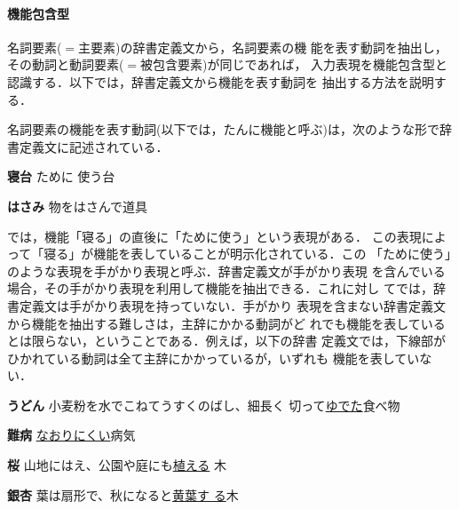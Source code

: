 \documentclass{nlp}
\begin{document}
\paragraph{機能包含型}名詞要素($=$主要素)の辞書定義文から，名詞要素の機
能を表す動詞を抽出し，その動詞と動詞要素($=$被包含要素)が同じであれば，
入力表現を機能包含型と認識する．以下では，辞書定義文から機能を表す動詞を
抽出する方法を説明する．

名詞要素の機能を表す動詞(以下では，たんに機能と呼ぶ)は，次のような形で辞
書定義文に記述されている．
\begin{example}
 \item {\bf 寝台} \hspace{10pt}ために
 使う台 
 
 \item {\bf はさみ} \hspace{10pt}物をはさんで道具 
\end{example}
では，機能「寝る」の直後に「ために使う」という表現がある．
この表現によって「寝る」が機能を表していることが明示化されている．この
「ために使う」のような表現を手がかり表現と呼ぶ．辞書定義文が手がかり表現
を含んでいる場合，その手がかり表現を利用して機能を抽出できる．これに対し
てでは，辞書定義文は手がかり表現を持っていない．手がかり
表現を含まない辞書定義文から機能を抽出する難しさは，主辞にかかる動詞がど
れでも機能を表しているとは限らない，ということである．例えば，以下の辞書
定義文では，下線部がひかれている動詞は全て主辞にかかっているが，いずれも
機能を表していない．
\begin{example}
 \item {\bf うどん} \hspace{10pt}小麦粉を水でこねてうすくのばし、細長く
 切って\underline{ゆでた}食べ物 
 
 \item {\bf 難病} \hspace{10pt}\underline{なおりにくい}病気

 \item {\bf 桜} \hspace{10pt}山地にはえ、公園や庭にも\underline{植える}
 木 

 \item {\bf 銀杏} \hspace{10pt} 葉は扇形で、秋になると\underline{黄葉す
 る}木 
\end{example}
\end{document}
